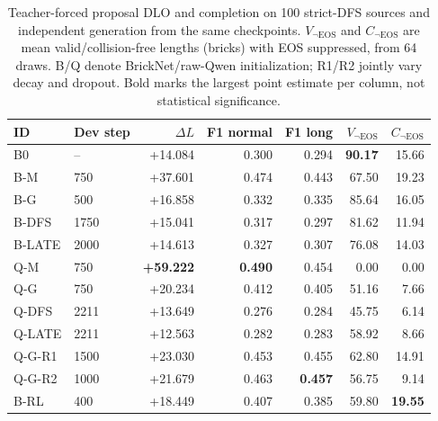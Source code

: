 \begin{table}[H]
\centering\small
\caption{Teacher-forced proposal DLO and completion on 100 strict-DFS sources and independent generation from the same checkpoints. $V_{\neg\mathrm{EOS}}$ and $C_{\neg\mathrm{EOS}}$ are mean valid/collision-free lengths (bricks) with EOS suppressed, from 64 draws. B/Q denote BrickNet/raw-Qwen initialization; R1/R2 jointly vary decay and dropout. Bold marks the largest point estimate per column, not statistical significance.}
\label{tab:main}
\setlength{\tabcolsep}{4pt}
\begin{tabular}{@{}llrrrrr@{}}\toprule
ID & Dev step & $\Delta L$ & F1 normal & F1 long & $V_{\neg\mathrm{EOS}}$ & $C_{\neg\mathrm{EOS}}$ \\ \midrule
B0 & -- & +14.084 & 0.300 & 0.294 & \textbf{90.17} & 15.66 \\
B-M & 750 & +37.601 & 0.474 & 0.443 & 67.50 & 19.23 \\
B-G & 500 & +16.858 & 0.332 & 0.335 & 85.64 & 16.05 \\
B-DFS & 1750 & +15.041 & 0.317 & 0.297 & 81.62 & 11.94 \\
B-LATE & 2000 & +14.613 & 0.327 & 0.307 & 76.08 & 14.03 \\
Q-M & 750 & \textbf{+59.222} & \textbf{0.490} & 0.454 & 0.00 & 0.00 \\
Q-G & 750 & +20.234 & 0.412 & 0.405 & 51.16 & 7.66 \\
Q-DFS & 2211 & +13.649 & 0.276 & 0.284 & 45.75 & 6.14 \\
Q-LATE & 2211 & +12.563 & 0.282 & 0.283 & 58.92 & 8.66 \\
Q-G-R1 & 1500 & +23.030 & 0.453 & 0.455 & 62.80 & 14.91 \\
Q-G-R2 & 1000 & +21.679 & 0.463 & \textbf{0.457} & 56.75 & 9.14 \\
B-RL & 400 & +18.449 & 0.407 & 0.385 & 59.80 & \textbf{19.55} \\
\bottomrule\end{tabular}
\end{table}
